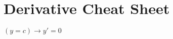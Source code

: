 \section{Derivative Cheat Sheet}
\begin{multicols}{2}
\hyperref[1]{$(y = c)\to y'=0$}

\end{multicols}